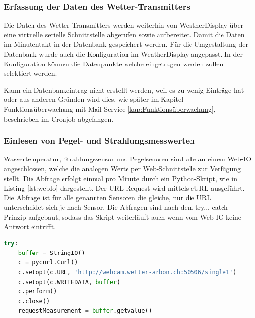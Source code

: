 \subsubsection{Erfassung der Daten des Wetter-Transmitters}
Die Daten des Wetter-Transmitters werden weiterhin von WeatherDisplay über eine virtuelle serielle Schnittstelle abgerufen sowie aufbereitet. Damit die Daten im Minutentakt in der Datenbank gespeichert werden. Für die Umgestaltung der Datenbank wurde auch die Konfiguration im WeatherDisplay angepasst.  In der Konfiguration können die Datenpunkte welche eingetragen werden sollen selektiert werden. 

Kann ein Datenbankeintrag nicht erstellt werden, weil es zu wenig Einträge hat oder aus anderen Gründen wird dies, wie später im Kapitel Funktionsüberwachung mit Mail-Service \ref{kap:Funktionsüberwachung}, beschrieben im Cronjob abgefangen.

\subsubsection{Einlesen von Pegel- und Strahlungsmesswerten}
Wassertemperatur, Strahlungssensor und Pegelsenoren sind alle an einem Web-IO angeschlossen, welche die analogen Werte per Web-Schnittstelle zur Verfügung stellt. Die Abfrage erfolgt einmal pro Minute durch ein Python-Skript, wie in Listing \ref{lst:webIo} dargestellt. Der URL-Request wird mittels cURL ausgeführt. Die Abfrage ist für alle genannten Sensoren die gleiche, nur die URL unterscheidet sich je nach Sensor. Die Abfragen sind nach dem try... catch - Prinzip aufgebaut, sodass das Skript weiterläuft auch wenn vom Web-IO keine Antwort eintrifft.

\begin{lstlisting}[label=lst:webIo,caption=Python-Script zur Web-Abfrage des Pegel-Messwerts, language=python, style=py]
try:
    buffer = StringIO()
    c = pycurl.Curl()
    c.setopt(c.URL, 'http://webcam.wetter-arbon.ch:50506/single1')
    c.setopt(c.WRITEDATA, buffer)
    c.perform()
    c.close()
    requestMeasurement = buffer.getvalue()
\end{lstlisting}


